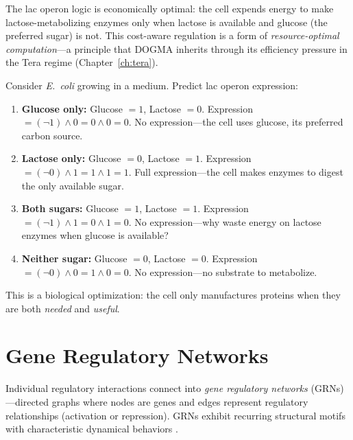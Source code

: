 \begin{bioinsight}
The lac operon logic is economically optimal: the cell expends energy to make lactose-metabolizing enzymes only when lactose is available and glucose (the preferred sugar) is not. This cost-aware regulation is a form of \emph{resource-optimal computation}---a principle that DOGMA inherits through its efficiency pressure in the Tera regime (Chapter~\ref{ch:tera}).
\end{bioinsight}

\begin{example}
Consider \emph{E.\ coli} growing in a medium. Predict lac operon expression:

\begin{enumerate}[label=(\alph*)]
  \item \textbf{Glucose only:} Glucose $= 1$, Lactose $= 0$. Expression $= (\lnot 1) \land 0 = 0 \land 0 = 0$. No expression---the cell uses glucose, its preferred carbon source.
  \item \textbf{Lactose only:} Glucose $= 0$, Lactose $= 1$. Expression $= (\lnot 0) \land 1 = 1 \land 1 = 1$. Full expression---the cell makes enzymes to digest the only available sugar.
  \item \textbf{Both sugars:} Glucose $= 1$, Lactose $= 1$. Expression $= (\lnot 1) \land 1 = 0 \land 1 = 0$. No expression---why waste energy on lactose enzymes when glucose is available?
  \item \textbf{Neither sugar:} Glucose $= 0$, Lactose $= 0$. Expression $= (\lnot 0) \land 0 = 1 \land 0 = 0$. No expression---no substrate to metabolize.
\end{enumerate}

This is a biological optimization: the cell only manufactures proteins when they are both \emph{needed} and \emph{useful}.
\end{example}

\section{Gene Regulatory Networks}
\label{sec:grn}

Individual regulatory interactions connect into \emph{gene regulatory networks} (GRNs)---directed graphs where nodes are genes and edges represent regulatory relationships (activation or repression). GRNs exhibit recurring structural motifs with characteristic dynamical behaviors \citep{alon2019}.

